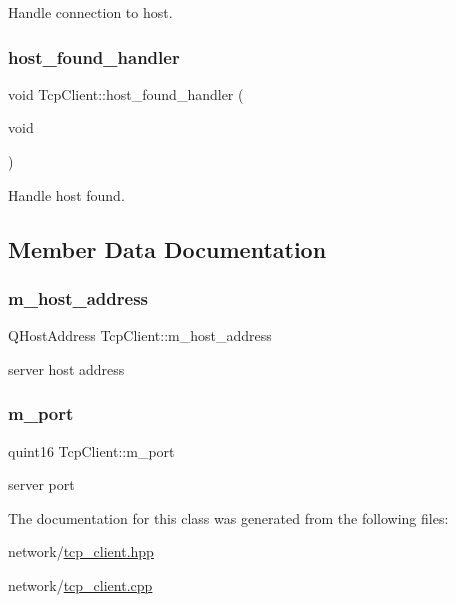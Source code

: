 Handle connection to host. 

\mbox{\label{class_tcp_client_a2c1b8363f05d55bc06335f8da4c7fc8e}} 
\subsubsection{\texorpdfstring{host\_found\_handler}{host\_found\_handler}}
{\footnotesize\ttfamily void Tcp\+Client\+::host\+\_\+found\+\_\+handler (\begin{DoxyParamCaption}\item[{void}]{ }\end{DoxyParamCaption})\hspace{0.3cm}{\ttfamily [slot]}}



Handle host found. 



\subsection{Member Data Documentation}
\mbox{\label{class_tcp_client_acf0e0d339a1160852fd2ed2eaf4dce7f}} 
\subsubsection{\texorpdfstring{m\_host\_address}{m\_host\_address}}
{\footnotesize\ttfamily Q\+Host\+Address Tcp\+Client\+::m\+\_\+host\+\_\+address\hspace{0.3cm}{\ttfamily [private]}}

server host address \mbox{\label{class_tcp_client_a9c8dbdd8d4571d37bc774d17b627c2d5}} 
\subsubsection{\texorpdfstring{m\_port}{m\_port}}
{\footnotesize\ttfamily quint16 Tcp\+Client\+::m\+\_\+port\hspace{0.3cm}{\ttfamily [private]}}

server port 

The documentation for this class was generated from the following files\+:\begin{DoxyCompactItemize}
\item 
network/\mbox{\hyperlink{tcp__client_8hpp}{tcp\+\_\+client.\+hpp}}\item 
network/\mbox{\hyperlink{tcp__client_8cpp}{tcp\+\_\+client.\+cpp}}\end{DoxyCompactItemize}
